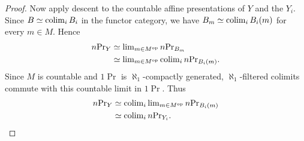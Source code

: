 \documentclass[11pt]{book}
\begin{document}
\begin{proof}
		Now apply descent to the countable affine presentations of $Y$ and
		the $Y_i$. Since $B \simeq \operatorname{colim}_i B_i$ in the functor category, we
		have $B_m \simeq \operatorname{colim}_i B_i(m)$ for every $m \in M$. Hence
		\[
		\begin{aligned}
			n\textup{Pr}_Y
			&\simeq \operatorname{lim}_{m \in M^{\textup{op}}} n\textup{Pr}_{B_m} \\
			&\simeq \operatorname{lim}_{m \in M^{\textup{op}}}\operatorname{colim}_i n\textup{Pr}_{B_i(m)}.
		\end{aligned}
		\]
		Since $M$ is countable and $1\Pr$ is $\aleph_1$-compactly generated,
		$\aleph_1$-filtered colimits commute with this countable limit in
		$1\Pr$. Thus
		\[
		\begin{aligned}
			n\textup{Pr}_Y
			&\simeq \operatorname{colim}_i \operatorname{lim}_{m \in M^{\textup{op}}} n\textup{Pr}_{B_i(m)} \\
			&\simeq \operatorname{colim}_i n\textup{Pr}_{Y_i}.
		\end{aligned} \qedhere
		\]
	\end{proof}
\end{document}
